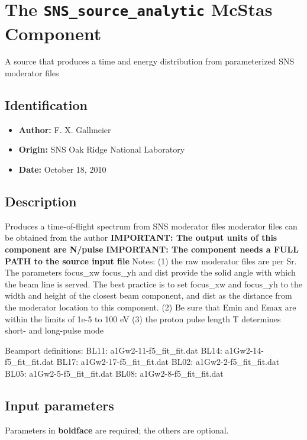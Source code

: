 \section{The \texttt{SNS\_source\_analytic} McStas Component}
A source that produces a time and energy distribution from
parameterized SNS moderator files

\subsection*{Identification}
\begin{itemize}
  \item \textbf{Author:} F. X. Gallmeier
  \item \textbf{Origin:} SNS Oak Ridge National Laboratory
  \item \textbf{Date:} October 18, 2010
\end{itemize}

\subsection*{Description}
Produces a time-of-flight spectrum from SNS moderator files moderator files can be obtained from the author \textbf{IMPORTANT: The output units of this component are N/pulse} \textbf{IMPORTANT: The component needs a FULL PATH to the source input file} Notes: (1) the raw moderator files are per Sr. The parameters focus\_xw focus\_yh and dist provide the solid angle with which the beam line is served. The best practice is to set focus\_xw and focus\_yh to the width and height of the closest beam component, and dist as the distance from the moderator location to this component. (2) Be sure that Emin and Emax are within the limits of 1e-5 to 100 eV (3) the proton pulse length T determines short- and long-pulse mode

Beamport definitions: BL11: a1Gw2-11-f5\_fit\_fit.dat BL14: a1Gw2-14-f5\_fit\_fit.dat BL17: a1Gw2-17-f5\_fit\_fit.dat BL02: a1Gw2-2-f5\_fit\_fit.dat BL05: a1Gw2-5-f5\_fit\_fit.dat BL08: a1Gw2-8-f5\_fit\_fit.dat

\subsection*{Input parameters}
Parameters in \textbf{boldface} are required; the others are optional.

